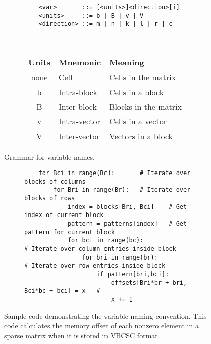 \begin{figure}[tbh]
  \centering
  \begin{subfigure}[t]{0.6\textwidth}
      \begin{verbatim}
    <var>       ::= [<units>]<direction>[i]
    <units>     ::= b | B | v | V
    <direction> ::= m | n | k | l | r | c
  \end{verbatim}
  \end{subfigure}
  ~~~~
  \begin{subfigure}[t]{0.6\textwidth}
    \centering
    \begin{tabular}{cll}
		\toprule
		Units    & Mnemonic & Meaning \\
		\midrule

		none  & Cell          & Cells in the matrix      \\
		b     & Intra-block   & Cells in a block         \\
		B     & Inter-block   & Blocks in the matrix     \\
		v     & Intra-vector  & Cells in a vector        \\
		V     & Inter-vector  & Vectors in a block       \\
		\bottomrule
	\end{tabular}
  \end{subfigure}
    \caption{Grammar for variable names.}
  \label{fig:grammar}
\end{figure}
\begin{figure}[tbh]
  \begin{subfigure}[b]{\textwidth}
  \begin{verbatim}
    for Bci in range(Bc):       # Iterate over blocks of columns
        for Bri in range(Br):   # Iterate over blocks of rows
            index = blocks[Bri, Bci]	# Get index of current block
            pattern = patterns[index]	# Get pattern for current block
            for bci in range(bc):               # Iterate over column entries inside block
                for bri in range(br):           # Iterate over row entries inside block
                    if pattern[bri,bci]:
                        offsets[Bri*br + bri, Bci*bc + bci] = x   # 
                        x += 1

\end{verbatim}
\end{subfigure}
  \caption{Sample code demonstrating the variable naming convention. This code calculates the memory offset of each nonzero element in a sparse matrix when it is stored in VBCSC format.}
  \label{fig:samplegrammar}
\end{figure}

